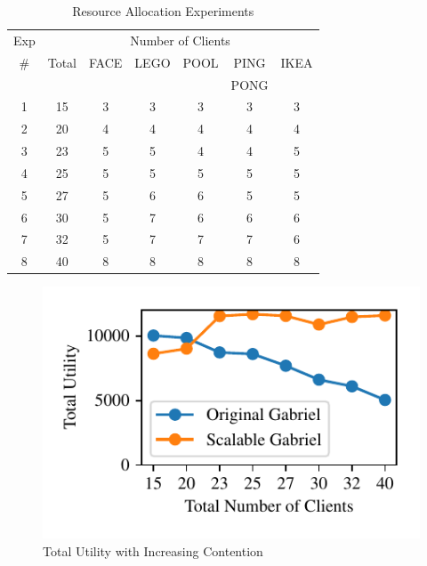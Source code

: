 \begin{table}
\centering
\begin{tabular}{|c|c||c|c|c|c|c|}
  \hline
  Exp & \multicolumn{6}{|c|}{Number of Clients} \\
  \cline{2-7}
  \#  & Total & FACE & LEGO & POOL & PING & IKEA \\
      &      &   &   &  & PONG &  \\ \hline
  1   & 15  & 3 & 3 & 3 & 3 & 3 \\ \hline
  2   & 20  & 4 & 4 & 4 & 4 & 4 \\ \hline
  3   & 23  & 5 & 5 & 4 & 4 & 5\\ \hline
  4   & 25  & 5 & 5 & 5 & 5 & 5 \\ \hline
  5   & 27  & 5 & 6 & 6 & 5 & 5 \\ \hline
  6  & 30  & 5 & 7 & 6 & 6 & 6 \\ \hline
  7  & 32  & 5 & 7 & 7 & 7 & 6 \\ \hline
  8  & 40  & 8 & 8 & 8 & 8 & 8 \\ \hline
\end{tabular}
\vspace{0.1in}
\caption{\small Resource Allocation Experiments} 
\label{tab:alloc-exps}
\vspace{-0.2in}
\end{table}

\begin{figure}
  \centering
  \includegraphics[scale=1.]{FIGS/fig-alloc-max-util.pdf}
  \caption{\small Total Utility with Increasing Contention}
  \label{fig:alloc-max-util}
\end{figure}

